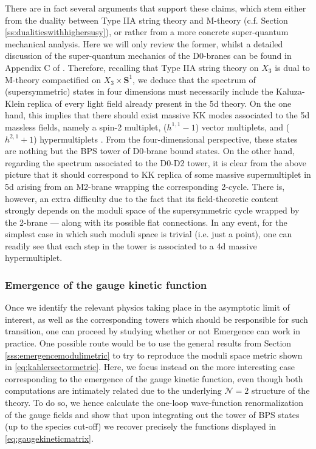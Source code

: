 There are in fact several arguments that support these claims, which stem either from the duality between Type IIA string theory and M-theory (c.f. Section \ref{ss:dualitieswithhighersusy}), or rather from a more concrete super-quantum mechanical analysis. Here we will only review the former, whilst a detailed discussion of the super-quantum mechanics of the D0-branes can be found in Appendix C of \cite{Castellano:2022bvr}. Therefore, recalling that Type IIA string theory on $X_3$ is dual to M-theory compactified on $X_3 \times \mathbf{S}^1$, we deduce that the spectrum of (supersymmetric) states in four dimensions must necessarily include the Kaluza-Klein replica of every light field already present in the 5d theory. On the one hand, this implies that there should exist massive KK modes associated to the 5d massless fields, namely a spin-2 multiplet, ($h^{1,1}-1$) vector multiplets, and ($h^{2,1}+1$) hypermultiplets \cite{Cadavid:1995bk}. From the four-dimensional perspective, these states are nothing but the BPS tower of D0-brane bound states. On the other hand, regarding the spectrum associated to the D0-D2 tower, it is clear from the above picture that it should correspond to KK replica of some massive supermultiplet in 5d arising from an M2-brane wrapping the corresponding 2-cycle. There is, however, an extra difficulty due to the fact that its field-theoretic content strongly depends on the moduli space of the supersymmetric cycle wrapped by the 2-brane --- along with its possible flat connections. In any event, for the simplest case in which such moduli space is trivial (i.e. just a point), one can readily see that each step in the tower is associated to a 4d massive hypermultiplet.
		
		
\subsubsection{Emergence of the gauge kinetic function}
\label{ss:4doneloop}
Once we identify the relevant physics taking place in the asymptotic limit of interest, as well as the corresponding towers which should be responsible for such transition, one can proceed by studying whether or not Emergence can work in practice. One possible route would be to use the general results from Section \ref{sss:emergencemodulimetric} to try to reproduce the moduli space metric shown in \eqref{eq:kahlersectormetric}. Here, we focus instead on the more interesting case corresponding to the emergence of the gauge kinetic function, even though both computations are intimately related due to the underlying $\mathcal{N}=2$ structure of the theory. To do so, we hence calculate the one-loop wave-function renormalization of the gauge fields and show that upon integrating out the tower of BPS states (up to the species cut-off) we recover precisely the functions displayed in \eqref{eq:gaugekineticmatrix}.
		
